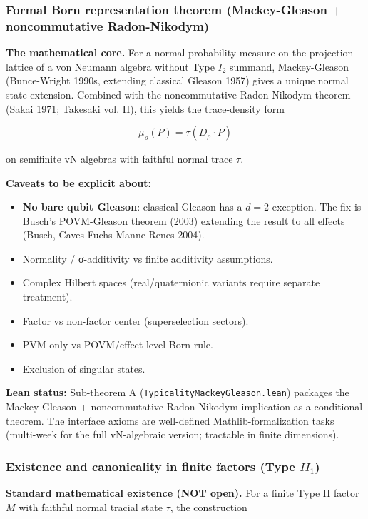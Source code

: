 \documentclass[11pt,a4paper]{article}
\begin{document}
\subsubsection{Formal Born representation theorem (Mackey-Gleason + noncommutative Radon-Nikodym)}

\textbf{The mathematical core.} For a normal probability measure on the projection lattice of a von Neumann algebra without Type $I_2$ summand, Mackey-Gleason (Bunce-Wright 1990s, extending classical Gleason 1957) gives a unique normal state extension. Combined with the noncommutative Radon-Nikodym theorem (Sakai 1971; Takesaki vol. II), this yields the trace-density form

\[
\mu_\rho(P) = \tau(D_\rho \cdot P)
\]

on semifinite vN algebras with faithful normal trace $\tau$.

\textbf{Caveats to be explicit about:}
\begin{itemize}
  \item \textbf{No bare qubit Gleason}: classical Gleason has a $d=2$ exception. The fix is Busch's POVM-Gleason theorem (2003) extending the result to all effects (Busch, Caves-Fuchs-Manne-Renes 2004).
  \item Normality / σ-additivity vs finite additivity assumptions.
  \item Complex Hilbert spaces (real/quaternionic variants require separate treatment).
  \item Factor vs non-factor center (superselection sectors).
  \item PVM-only vs POVM/effect-level Born rule.
  \item Exclusion of singular states.
\end{itemize}

\textbf{Lean status:} Sub-theorem A (\texttt{TypicalityMackeyGleason.lean}) packages the Mackey-Gleason + noncommutative Radon-Nikodym implication as a conditional theorem. The interface axioms are well-defined Mathlib-formalization tasks (multi-week for the full vN-algebraic version; tractable in finite dimensions).

\subsubsection{Existence and canonicality in finite factors (Type $II_1$)}

\textbf{Standard mathematical existence (NOT open).} For a finite Type II factor $M$ with faithful normal tracial state $\tau$, the construction
\end{document}
